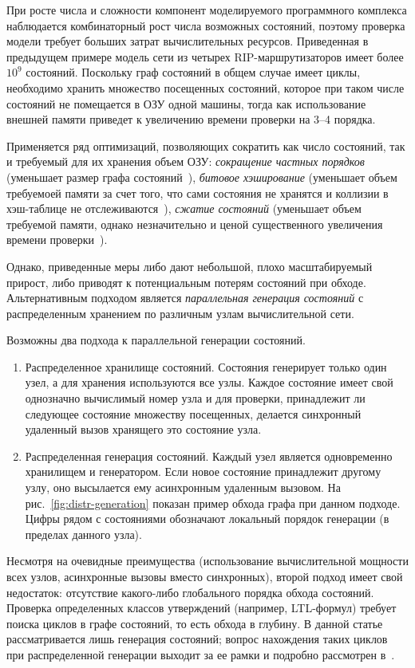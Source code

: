 \documentclass[12pt,a4paper,fleqn]{article}
\begin{document}
При росте числа и сложности компонент моделируемого программного комплекса наблюдается комбинаторный рост числа
возможных состояний, поэтому проверка модели требует больших затрат вычислительных ресурсов. Приведенная в предыдущем
примере модель сети из четырех RIP-маршрутизаторов имеет более $10^9$ состояний. Поскольку граф состояний в общем случае
имеет циклы, необходимо хранить множество посещенных состояний, которое при таком числе состояний не помещается в ОЗУ
одной машины, тогда как использование внешней памяти приведет к увеличению времени проверки на 3--4 порядка.

Применяется ряд оптимизаций, позволяющих сократить как число состояний, так и требуемый для их хранения объем ОЗУ:
\emph{сокращение частных порядков} (уменьшает размер графа состояний~\cite{POD}), \emph{битовое хэширование} (уменьшает
объем требуемоей памяти за счет того, что сами состояния не хранятся и коллизии в хэш-таблице не
отслеживаются~\cite{BitHash1, Wolper}), \emph{сжатие состояний} (уменьшает объем требуемой памяти, однако незначительно
и ценой существенного увеличения времени проверки~\cite{StateCompr}). 

Однако, приведенные меры либо дают небольшой, плохо масштабируемый прирост, либо приводят к потенциальным потерям
состояний при обходе. Альтернативным подходом является \emph{параллельная генерация состояний} с распределенным
хранением по различным узлам вычислительной сети.

Возможны два подхода к параллельной генерации состояний.

\begin{enumerate}
\item Распределенное хранилище состояний. Состояния генерирует только один узел, а для хранения используются все
  узлы. Каждое состояние имеет свой однозначно вычислимый номер узла и для проверки, принадлежит ли следующее состояние
  множеству посещенных, делается синхронный удаленный вызов хранящего это состояние узла.

\item Распределенная генерация состояний. Каждый узел является одновременно хранилищем и генератором. Если новое
  состояние принадлежит другому узлу, оно высылается ему асинхронным удаленным вызовом. На
  рис.~\ref{fig:distr-generation} показан пример обхода графа при данном подходе. Цифры рядом с состояниями обозначают
  локальный порядок генерации (в пределах данного узла).
\end{enumerate}

Несмотря на очевидные преимущества (использование вычислительной мощности всех узлов, асинхронные вызовы вместо
синхронных), второй подход имеет свой недостаток: отсутствие какого-либо глобального порядка обхода состояний. Проверка
определенных классов утверждений (например, LTL-формул) требует поиска циклов в графе состояний, то есть обхода в
глубину. В данной статье рассматривается лишь генерация состояний; вопрос нахождения таких циклов при распределенной
генерации выходит за ее рамки и подробно рассмотрен в~\cite{DLTL1,DLTL2}.
\end{document}
